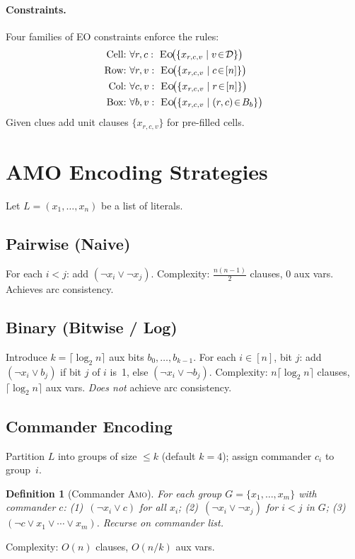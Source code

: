\documentclass[preprint,10pt,authoryear]{elsarticle}
\newtheorem{definition}{Definition}[section]
\newcommand{\AMO}{\textsc{Amo}}
\newcommand{\EO}{\textsc{Eo}}
\begin{document}
\paragraph{Constraints.}
Four families of EO constraints enforce the rules:
\begin{align}
  \text{Cell:}\ &\forall r,c:\ \EO\!\bigl(\{x_{r,c,v}\mid v\!\in\!\mathcal{D}\}\bigr)\\
  \text{Row:}\ &\forall r,v:\ \EO\!\bigl(\{x_{r,c,v}\mid c\!\in\![n]\}\bigr)\\
  \text{Col:}\ &\forall c,v:\ \EO\!\bigl(\{x_{r,c,v}\mid r\!\in\![n]\}\bigr)\\
  \text{Box:}\ &\forall b,v:\ \EO\!\bigl(\{x_{r,c,v}\mid(r,c)\!\in\!B_b\}\bigr)
\end{align}
Given clues add unit clauses $\{x_{r,c,v}\}$ for pre-filled cells.

\section{AMO Encoding Strategies}
\label{sec:encoding}

Let $L=(x_1,\ldots,x_n)$ be a list of literals.

\subsection{Pairwise (Naive)}
For each $i<j$: add $(\neg x_i\vee\neg x_j)$.
Complexity: $\frac{n(n-1)}{2}$ clauses, 0 aux vars. Achieves arc consistency.

\subsection{Binary (Bitwise / Log)}
Introduce $k=\lceil\log_2 n\rceil$ aux bits $b_0,\ldots,b_{k-1}$.
For each $i\in[n]$, bit $j$: add $(\neg x_i\vee b_j)$ if bit $j$ of $i$ is~1,
else $(\neg x_i\vee\neg b_j)$.
Complexity: $n\lceil\log_2 n\rceil$ clauses, $\lceil\log_2 n\rceil$ aux vars.
\emph{Does not} achieve arc consistency.

\subsection{Commander Encoding~\citep{Klieber2007}}
Partition $L$ into groups of size $\leq k$ (default $k=4$); assign
commander $c_i$ to group~$i$.
\begin{definition}[Commander \AMO{}]
For each group $G=\{x_1,\ldots,x_m\}$ with commander $c$:
(1)~$(\neg x_i\vee c)$ for all $x_i$;
(2)~$(\neg x_i\vee\neg x_j)$ for $i<j$ in $G$;
(3)~$(\neg c\vee x_1\vee\cdots\vee x_m)$.
Recurse on commander list.
\end{definition}
Complexity: $O(n)$ clauses, $O(n/k)$ aux vars.
\end{document}
